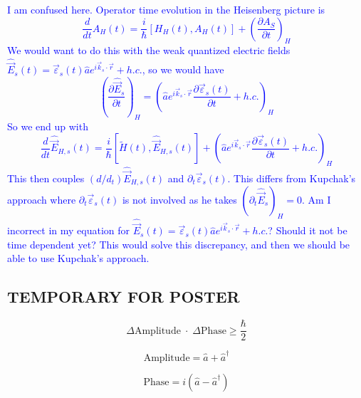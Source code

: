 \documentclass[aps,pra,showpacs,amsmath,amssymb,nofootinbib,longbibliography,superscriptaddress
]{revtex4-1}
\theoremstyle{definition}
\theoremstyle{remark}
\newcommand{\0}{\hat{0}}
\begin{document}
\textcolor{blue}{I am confused here. Operator time evolution in the Heisenberg picture is
\begin{equation}
    \frac{d}{dt}A_{H}(t) = \frac{i}{\hbar} \left[ H_H(t), A_H(t) \right] + {\left( \frac{\partial A_S}{\partial t} \right)}_H
\end{equation}
We would want to do this with the weak quantized electric fields $\hat{\vec{E}}_s(t) = \vec{\varepsilon}_s(t) \hat{a} e^{i \vec{k}_s \cdot \vec{r}} + h.c.$, so we would have
\begin{equation}
    {\left( \frac{\partial \hat{\vec{E}}_s}{\partial t} \right)}_H = {\left(\hat{a} e^{i \vec{k}_s \cdot \vec{r}}  \frac{\partial \vec{\varepsilon}_s(t)}{\partial t} + h.c.\right)}_H
\end{equation}
So we end up with
\begin{equation}
    \frac{d}{dt}\hat{\vec{E}}_{H,s}(t) = \frac{i}{\hbar} \left[ \tilde{H}(t), \hat{\vec{E}}_{H,s}(t) \right] + {\left(\hat{a} e^{i \vec{k}_s \cdot \vec{r}}  \frac{\partial \vec{\varepsilon}_s(t)}{\partial t}  + h.c.\right)}_H
\end{equation}
This then couples $(d/d_t) \hat{\vec{E}}_{H,s}(t)$ and $\partial_t \vec{\varepsilon}_s(t)$. This differs from Kupchak's approach where $\partial_t \vec{\varepsilon}_s(t)$ is not involved as he takes ${\left( \partial_t \hat{\vec{E}}_s \right)}_H=0$. Am I incorrect in my equation for $\hat{\vec{E}}_s(t) = \vec{\varepsilon}_s(t) \hat{a} e^{i \vec{k}_s \cdot \vec{r}} + h.c.$? Should it not be time dependent yet? This would solve this discrepancy, and then we should be able to use Kupchak's approach.
}



\subsection{TEMPORARY FOR POSTER}


\begin{equation}
    \Delta \text{Amplitude} \;\cdot \; \Delta \text{Phase} \geq \frac{\hbar}{2}
\end{equation}

\begin{equation}
    \text{Amplitude} = \hat{a} + \hat{a}^{\dagger}
\end{equation}

\begin{equation}
    \text{Phase} =i\left(\hat{a} - \hat{a}^{\dagger}\right)
\end{equation}
\end{document}
